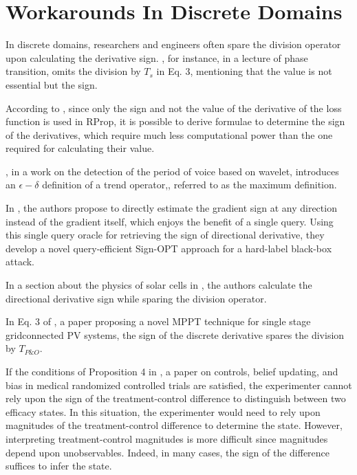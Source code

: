 \documentclass[11pt]{book}
\begin{document}

\section{Workarounds In Discrete Domains}

In discrete domains, researchers and engineers often spare the division
operator upon calculating the derivative sign. \cite{schwartzlecture}, for instance, in a lecture of phase transition, omits the division by $T_{s}$ in Eq. 3, mentioning
that the value is not essential but the sign.

According to \cite{valishevsky2002adaptive}, since only
the sign and not the value of the derivative of the loss function
is used in RProp, it is possible to derive
formulae to determine the sign of the derivatives, which require much
less computational power than the one required for calculating their value.

\cite{guan2012detection}, in a work on the detection of the period of voice based on wavelet, introduces an $\epsilon-\delta$ definition
of a \textquotedbl trend operator,\textquotedbl{}, referred to as the
maximum definition.

In \cite{cheng2019sign}, the authors propose to directly estimate
the gradient sign at any direction instead of the gradient itself,
which enjoys the benefit of a single query. Using this single query
oracle for retrieving the sign of directional derivative, they develop
a novel query-efficient Sign-OPT approach for a hard-label black-box
attack.

In a section about the physics of solar cells in \cite{de2016analysis},
the authors calculate the directional derivative sign while sparing
the division operator.

In Eq. 3 of \cite{costanzo2019novel}, a paper proposing a novel MPPT technique for single stage gridconnected
PV systems, the sign of the discrete derivative
spares the division by $T_{P\&O}$.

If the conditions of Proposition 4 in \cite{chemla2019controls}, a paper on controls, belief updating, and bias in
medical randomized controlled trials are
satisfied, the experimenter cannot rely upon the sign of the treatment-control
difference to distinguish between two efficacy states. In this
situation, the experimenter would need to rely upon magnitudes of
the treatment-control difference to determine the state. However,
interpreting treatment-control magnitudes is more difficult since
magnitudes depend upon unobservables. Indeed, in many cases, the sign
of the difference suffices to infer the state.
\end{document}

